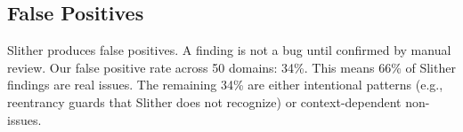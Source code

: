 \subsection{False Positives}

Slither produces false positives. A finding is not a bug until confirmed by manual
review. Our false positive rate across 50 domains: 34\%. This means 66\% of Slither
findings are real issues. The remaining 34\% are either intentional patterns
(e.g., reentrancy guards that Slither does not recognize) or context-dependent
non-issues.

